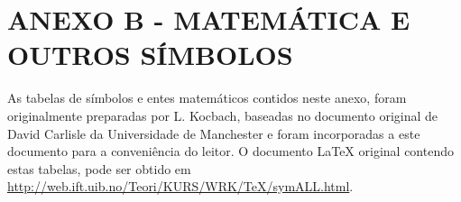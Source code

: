 \renewcommand{\thechapter}{}%
\chapter{ANEXO B - MATEMÁTICA E OUTROS SÍMBOLOS} %
\label{anexoB} %
\renewcommand{\thechapter}{B}%

As tabelas de símbolos e entes matemáticos contidos neste anexo, foram originalmente preparadas por L. Kocbach, baseadas no documento original de David Carlisle da Universidade de Manchester e foram incorporadas a este documento para a conveniência do leitor. O documento \LaTeX{} original contendo estas tabelas, pode ser obtido em \url{http://web.ift.uib.no/Teori/KURS/WRK/TeX/symALL.html}.


\def\W#1#2{$#1{#2}$ &\tt\string#1\string{#2\string}}
\def\X#1{$#1$ &\tt\string#1}
\def\Y#1{$\big#1$ &\tt\string#1}
\def\Z#1{\tt\string#1}




